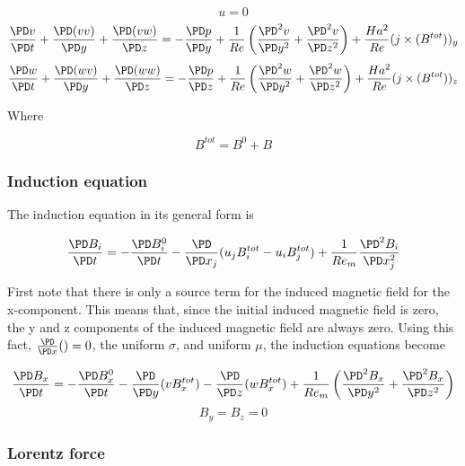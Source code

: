 \documentclass[11pt]{article}
\begin{document}
\begin{equation}
	u=0
\end{equation}
\begin{equation}
	\frac{\PD v}{\PD t}
	+ \frac{\PD (v v)}{\PD y}
	+ \frac{\PD (v w)}{\PD z}
	=
	- \frac{\PD p}{\PD y}
	+ \frac{1}{Re}
	\left(
	\frac{\PD^2 v}{\PD y^2}
	+\frac{\PD^2 v}{\PD z^2}
	\right)
	+ \frac{Ha^2}{Re}
	(j \times (B^{tot}))_y
\end{equation}
\begin{equation}
	\frac{\PD w}{\PD t}
	+ \frac{\PD (w v)}{\PD y}
	+ \frac{\PD (w w)}{\PD z}
	=
	- \frac{\PD p}{\PD z}
	+ \frac{1}{Re}
	\left(
	\frac{\PD^2 w}{\PD y^2}
	+\frac{\PD^2 w}{\PD z^2}
	\right)
	+ \frac{Ha^2}{Re}
	(j \times (B^{tot}))_z
\end{equation}

Where

\begin{equation}
	B^{tot} = B^0 + B
\end{equation}

\subsubsection{Induction equation}

The induction equation in its general form is

\begin{equation}
	\frac{\PD B_i}{\PD t}
	=
	- \frac{\PD B_i^0}{\PD t}
	- \frac{\PD}{\PD x_j} (u_j B_i^{tot} - u_i B_j^{tot})
	+
	\frac{1}{Re_m}
	\frac{\PD^2 B_i}{\PD x_j^2}
\end{equation}

First note that there is only a source term for the induced magnetic field for the x-component. This means that, since the initial induced magnetic field is zero, the y and z components of the induced magnetic field are always zero. Using this fact, $\frac{\PD}{\PD x} ()=0$, the uniform $\sigma$, and uniform $\mu$, the induction equations become


\begin{equation}
	\frac{\PD B_x}{\PD t}
	=
	- \frac{\PD B_x^0}{\PD t}
	- \frac{\PD}{\PD y} (v B_x^{tot})
	- \frac{\PD}{\PD z} (w B_x^{tot})
	+ \frac{1}{Re_m}
	\left(
	\frac{\PD^2 B_x}{\PD y^2}
	+
	\frac{\PD^2 B_x}{\PD z^2}
	\right)
\end{equation}
\begin{equation}
	B_y = B_z = 0
\end{equation}

\subsubsection{Lorentz force}
\end{document}

